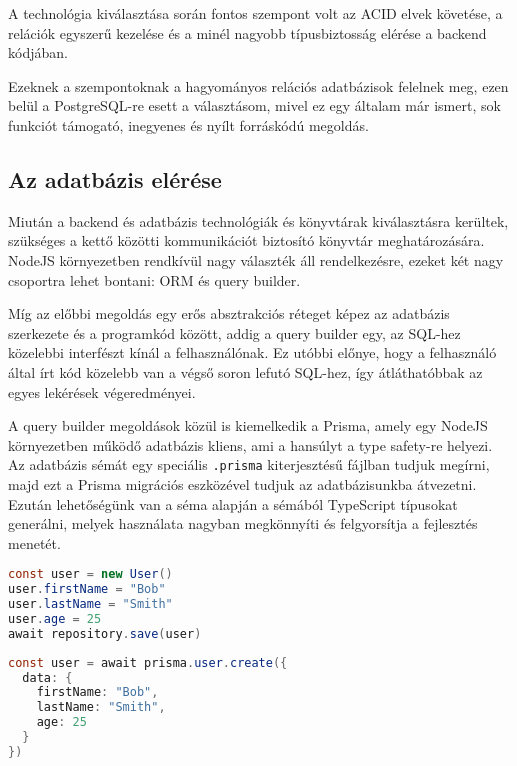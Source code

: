 A technológia kiválasztása során fontos szempont volt az ACID elvek követése, a relációk egyszerű kezelése és a minél nagyobb típusbiztosság elérése a backend kódjában.

Ezeknek a szempontoknak a hagyományos relációs adatbázisok felelnek meg, ezen belül a PostgreSQL-re esett a választásom, mivel ez egy általam már ismert, sok funkciót támogató, inegyenes és nyílt forráskódú megoldás. \cite{Postgresql}

\subsection{Az adatbázis elérése}
Miután a backend és adatbázis technológiák és könyvtárak kiválasztásra kerültek, szükséges a kettő közötti kommunikációt biztosító könyvtár meghatározására.
NodeJS környezetben rendkívül nagy választék áll rendelkezésre, ezeket két nagy csoportra lehet bontani: ORM és query builder.

Míg az előbbi megoldás egy erős absztrakciós réteget képez az adatbázis szerkezete és a programkód között, addig a query builder egy, az SQL-hez közelebbi interfészt kínál a felhasználónak.
Ez utóbbi előnye, hogy a felhasználó által írt kód közelebb van a végső soron lefutó SQL-hez, így átláthatóbbak az egyes lekérések végeredményei.

A query builder megoldások közül is kiemelkedik a Prisma, amely egy NodeJS környezetben működő adatbázis kliens, ami a hansúlyt a type safety-re helyezi.
Az adatbázis sémát egy speciális \lstinline|.prisma| kiterjesztésű fájlban tudjuk megírni, majd ezt a Prisma migrációs eszközével tudjuk az adatbázisunkba átvezetni.
Ezután lehetőségünk van a séma alapján a sémából TypeScript típusokat generálni, melyek használata nagyban megkönnyíti és felgyorsítja a fejlesztés menetét.

\begin{lstlisting}[language=Java, caption=Adatbázis beillesztés TypeORM környezetben]
const user = new User()
user.firstName = "Bob"
user.lastName = "Smith"
user.age = 25
await repository.save(user)
\end{lstlisting}

\begin{lstlisting}[language=Java, caption=Adatbázis beillesztés Prisma segítségével]
const user = await prisma.user.create({
  data: {
    firstName: "Bob",
    lastName: "Smith",
    age: 25
  }
})
\end{lstlisting}

